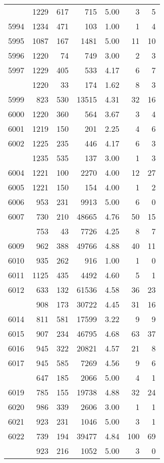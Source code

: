 \documentclass[
]{article}
\begin{document}
\begin{table}
\begin{tabular}[t]{lrrrrrr}
\addlinespace
5993 & 1229 & 617 & 715 & 5.00 & 3 & 5\\
5994 & 1234 & 471 & 103 & 1.00 & 1 & 4\\
5995 & 1087 & 167 & 1481 & 5.00 & 11 & 10\\
5996 & 1220 & 74 & 749 & 3.00 & 2 & 3\\
5997 & 1229 & 405 & 533 & 4.17 & 6 & 7\\
\addlinespace
5998 & 1220 & 33 & 174 & 1.62 & 8 & 3\\
5999 & 823 & 530 & 13515 & 4.31 & 32 & 16\\
6000 & 1220 & 360 & 564 & 3.67 & 3 & 4\\
6001 & 1219 & 150 & 201 & 2.25 & 4 & 6\\
6002 & 1225 & 235 & 446 & 4.17 & 6 & 3\\
\addlinespace
6003 & 1235 & 535 & 137 & 3.00 & 1 & 3\\
6004 & 1221 & 100 & 2270 & 4.00 & 12 & 27\\
6005 & 1221 & 150 & 154 & 4.00 & 1 & 2\\
6006 & 953 & 231 & 9913 & 5.00 & 6 & 0\\
6007 & 730 & 210 & 48665 & 4.76 & 50 & 15\\
\addlinespace
6008 & 753 & 43 & 7726 & 4.25 & 8 & 7\\
6009 & 962 & 388 & 49766 & 4.88 & 40 & 11\\
6010 & 935 & 262 & 916 & 1.00 & 1 & 0\\
6011 & 1125 & 435 & 4492 & 4.60 & 5 & 1\\
6012 & 633 & 132 & 61536 & 4.58 & 36 & 23\\
\addlinespace
6013 & 908 & 173 & 30722 & 4.45 & 31 & 16\\
6014 & 811 & 581 & 17599 & 3.22 & 9 & 9\\
6015 & 907 & 234 & 46795 & 4.68 & 63 & 37\\
6016 & 945 & 322 & 20821 & 4.57 & 21 & 8\\
6017 & 945 & 585 & 7269 & 4.56 & 9 & 6\\
\addlinespace
6018 & 647 & 185 & 2066 & 5.00 & 4 & 1\\
6019 & 785 & 155 & 19738 & 4.88 & 32 & 24\\
6020 & 986 & 339 & 2606 & 3.00 & 1 & 1\\
6021 & 923 & 231 & 1046 & 5.00 & 3 & 1\\
6022 & 739 & 194 & 39477 & 4.84 & 100 & 69\\
\addlinespace
6023 & 923 & 216 & 1052 & 5.00 & 3 & 0\\

\end{tabular}
\end{table}
\end{document}
